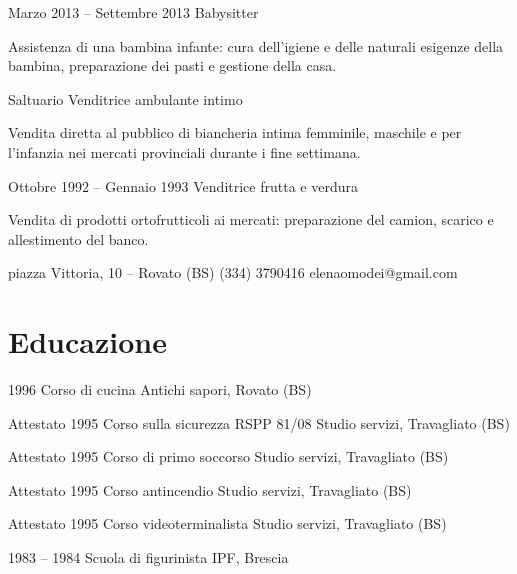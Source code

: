 \documentclass[fontsize=10pt]{tccv}
\begin{document}
\begin{eventlist}

\item{Marzo 2013 -- Settembre 2013}
     {}
     {Babysitter}

Assistenza di una bambina infante: cura dell'igiene e delle naturali
esigenze della bambina, preparazione dei pasti e gestione della casa.

\item{Saltuario}
     {}
     {Venditrice ambulante intimo}

Vendita diretta al pubblico di biancheria intima femminile, maschile e
per l'infanzia nei mercati provinciali durante i fine settimana.

\item{Ottobre 1992 -- Gennaio 1993}
     {}
     {Venditrice frutta e verdura}

Vendita di prodotti ortofrutticoli ai mercati: preparazione del camion,
scarico e allestimento del banco.

\end{eventlist}


\personal
    {piazza Vittoria, 10 -- Rovato (BS)}
    {(334) 3790416}
    {elenaomodei@gmail.com}


\section{Educazione}

\begin{yearlist}

\item{1996}
     {Corso di cucina}
     {Antichi sapori, Rovato (BS)}

\item[Attestato]{1995}
     {Corso sulla sicurezza RSPP 81/08}
     {Studio servizi, Travagliato (BS)}

\item[Attestato]{1995}
     {Corso di primo soccorso}
     {Studio servizi, Travagliato (BS)}

\item[Attestato]{1995}
     {Corso antincendio}
     {Studio servizi, Travagliato (BS)}

\item[Attestato]{1995}
     {Corso videoterminalista}
     {Studio servizi, Travagliato (BS)}

\item{1983 -- 1984}
     {Scuola di figurinista}
     {IPF, Brescia}

\end{yearlist}
\end{document}

